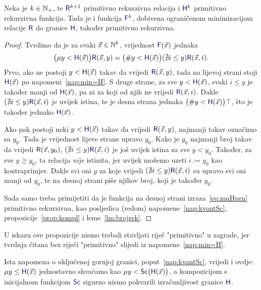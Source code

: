 \begin{propozicija}\label{prop:muHprn}
Neka je $k\in{\mathbb N}_+$, te $\f R^{k+1}$\! primitivno rekurzivna relacija i $\f H^k$ primitivno rekurzivna funkcija. Tada je i funkcija $\f F^k$\!, dobivena ograničenom minimizacijom relacije $\f R$ do granice $\f H$, također primitivno rekurzivna.
\end{propozicija}
\begin{proof}
Tvrdimo da je za svaki $\vec x\in{\mathbb N}^k$, vrijednost $\f F(\vec x)$ jednaka
    \begin{equation}\label{eq:muHprn}
        \bigl(\mu y<\f H(\vec x)\bigr)\f R(\vec x,y)
        =
        \bigl(\# y<\f H(\vec x)\bigr)(\nexists i\le y)\f R(\vec x,i).
    \end{equation}
Prvo, ako ne postoji $y<\f H(\vec x)$ takav da vrijedi $\f R(\vec x,y)$, tada na lijevoj strani stoji $\f H(\vec x)$ po napomeni~\ref{nap:min=H}. S druge strane, za sve $y<\f H(\vec x)$, svaki $i\le y$ je također manji od $\f H(\vec x)$, pa ni za koji od njih ne vrijedi $\f R(\vec x,i)$. Dakle $(\nexists i\le y)\f R(\vec x,i)$ je uvijek istina, te je desna strana jednaka $\bigl(\#y<\f H(\vec x)\bigr)\top$, što je također jednako $\f H(\vec x)$.
    
Ako pak postoji neki $y<\f H(\vec x)$ takav da vrijedi $\f R(\vec x,y)$, najmanji takav označimo sa $y_0$. Tada je vrijednost lijeve strane upravo $y_0$. Kako je $y_0$ najmanji broj takav da vrijedi $\f R(\vec x,y_0)$, $(\nexists i\le y)\f R(\vec x,i)$ je još uvijek istina za sve $y<y_0$. Također, za sve $y\ge y_0$, ta relacija \emph{nije} istinita, jer uvijek možemo uzeti $i:=y_0$ kao kontraprimjer. Dakle svi oni $y$ za koje vrijedi $(\nexists i\le y)\f R(\vec x,i)$ su upravo svi oni manji od $y_0$, te na desnoj strani piše njihov broj, koji je također $y_0$.
 
Sada samo treba primijetiti da je funkcija na desnoj strani izraza~\eqref{eq:muHprn} primitivno rekurzivna, kao posljedica (redom) napomene~\ref{nap:kvantSc}, propozicije~\ref{prop:kompl} i leme~\ref{lm:brojrek}.
\end{proof}
U iskazu ove propozicije nismo trebali stavljati riječ "primitivno" u zagrade, jer tvrdnja čitana bez riječi "primitivno" slijedi iz napomene~\ref{nap:min=H}.

\begin{napomena}\label{nap:muSc}
Ista napomena o uključenoj gornjoj granici, poput~\ref{nap:kvantSc}, vrijedi i ovdje:
$\mu y\le\f H(\vec x)$ jednostavno shvaćamo kao $\mu y<\f{Sc}\bigl(\f H(\vec x)\bigr)$, a kompozicijom s inicijalnom funkcijom $\f{Sc}$ sigurno nismo pokvarili izračunljivost granice $\f H$.
\end{napomena}
